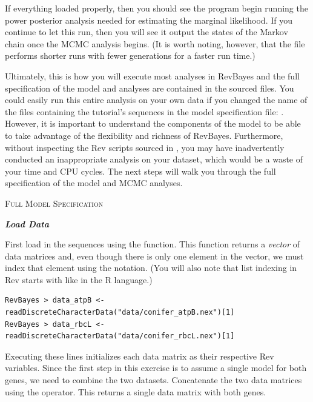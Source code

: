 If everything loaded properly, then you should see the program begin running the power posterior analysis needed for estimating the marginal likelihood. If you continue to let this run, then you will see it output the states of the Markov chain once the MCMC analysis begins. (It is worth noting, however, that the file  performs shorter runs with fewer generations for a faster run time.)

Ultimately, this is how you will execute most analyses in RevBayes and the full specification of the model and analyses are contained in the sourced files. 
You could easily run this entire analysis on your own data if you changed the name of the files containing the tutorial's sequences in the model specification file: . 
However, it is important to understand the components of the model to be able to take advantage of the flexibility and richness of RevBayes.
Furthermore, without inspecting the Rev scripts sourced in , you may have inadvertently conducted an inappropriate analysis on your dataset, which would be a waste of your time and CPU cycles. 
The next steps will walk you through the full specification of the model and MCMC analyses. 

\bigskip
{\large \textcolor{mycol}{\textsc{Full Model Specification}}}

\textbf{\textit{Load Data}}

First load in the sequences using the  function. This function returns a \textit{vector} of data matrices and, even though there is only one element in the vector, we must index that element using the \cl{[1]} notation. (You will also note that list indexing in Rev starts with  like in the R language.)
{\tt \begin{snugshade*}
\begin{lstlisting}
RevBayes > data_atpB <- readDiscreteCharacterData("data/conifer_atpB.nex")[1]
RevBayes > data_rbcL <- readDiscreteCharacterData("data/conifer_rbcL.nex")[1]
\end{lstlisting}
\end{snugshade*}}
Executing these lines initializes each data matrix as their respective Rev variables. 
Since the first step in this exercise is to assume a single model for both genes, we need to combine the two datasets.
Concatenate the two data matrices using the \cl{+} operator. This returns a single data matrix with both genes.

